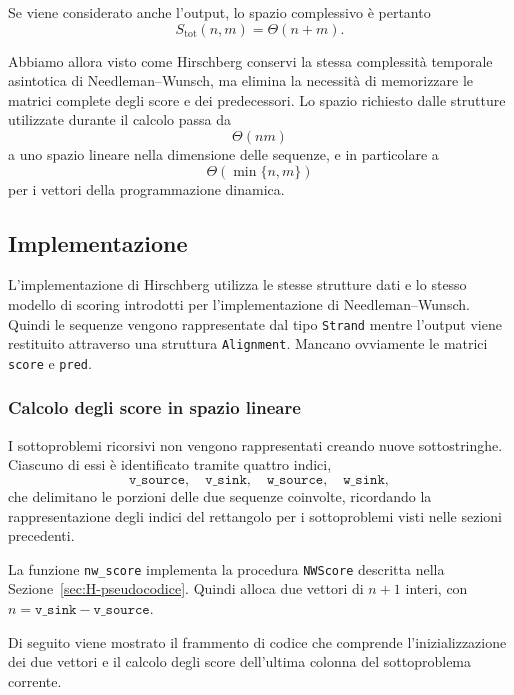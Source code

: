 Se viene considerato anche l'output, lo spazio complessivo è pertanto
\[
    S_{\mathrm{tot}}(n,m) = \Theta(n+m).
\]

Abbiamo allora visto come Hirschberg conservi la stessa complessità temporale asintotica di Needleman--Wunsch,
ma elimina la necessità di memorizzare le matrici complete degli score e dei predecessori.
Lo spazio richiesto dalle strutture utilizzate durante il calcolo passa da
\[
    \Theta(nm)
\]
a uno spazio lineare nella dimensione delle sequenze, e in particolare a
\[
    \Theta( \min \{ n,m \})
\]
per i vettori della programmazione dinamica.

\subsection{Implementazione}

L'implementazione di Hirschberg utilizza le stesse strutture dati e lo stesso modello di scoring introdotti
per l'implementazione di Needleman--Wunsch.
Quindi le sequenze vengono rappresentate dal tipo \texttt{Strand} mentre l'output viene restituito 
attraverso una struttura \texttt{Alignment}.
Mancano ovviamente le matrici \texttt{score} e \texttt{pred}.

\subsubsection{Calcolo degli score in spazio lineare}

I sottoproblemi ricorsivi non vengono rappresentati creando nuove sottostringhe.
Ciascuno di essi è identificato tramite quattro indici,
\[
\texttt{v\_source},\quad \texttt{v\_sink},\quad \texttt{w\_source},\quad \texttt{w\_sink},
\]
che delimitano le porzioni delle due sequenze coinvolte, ricordando la rappresentazione
degli indici del rettangolo per i sottoproblemi visti nelle sezioni precedenti.

La funzione \texttt{nw\_score} implementa la procedura \texttt{NWScore} descritta nella Sezione~\ref{sec:H-pseudocodice}.
Quindi alloca due vettori di $n+1$ interi, con $n = \texttt{v\_sink} - \texttt{v\_source}$.

Di seguito viene mostrato il frammento di codice che comprende l'inizializzazione dei due vettori
e il calcolo degli score dell'ultima colonna del sottoproblema corrente.

